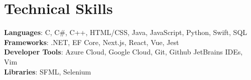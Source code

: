\section{Technical Skills}
  \begin{itemize}[leftmargin=0.15in, label={}]
    \small{\item{
     \textbf{Languages}{: C, C\#, C++, HTML/CSS, Java, JavaScript, Python, Swift, SQL} \\
     \textbf{Frameworks}{: .NET, EF Core, Next.js, React, Vue, Jest} \\
     \textbf{Developer Tools}{: Azure Cloud, Google Cloud, Git, Github JetBrains IDEs, Vim} \\
     \textbf{Libraries}{: SFML, Selenium}
    }}
  \end{itemize}

